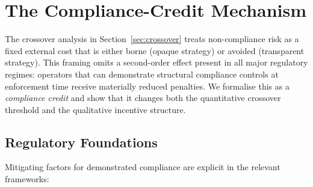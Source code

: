 %

\section{The Compliance-Credit Mechanism}
\label{sec:credits}

The crossover analysis in Section~\ref{sec:crossover} treats
non-compliance risk as a fixed external cost that is either borne
(opaque strategy) or avoided (transparent strategy). This framing
omits a second-order effect present in all major regulatory regimes:
operators that can demonstrate structural compliance controls at
enforcement time receive materially reduced penalties. We formalise
this as a \emph{compliance credit} and show that it changes both the
quantitative crossover threshold and the qualitative incentive
structure.

\subsection{Regulatory Foundations}
\label{subsec:legal-foundations}

Mitigating factors for demonstrated compliance are explicit in the
relevant frameworks:

